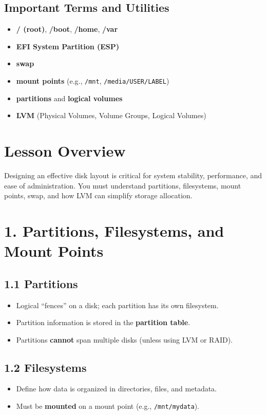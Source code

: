 \documentclass[12pt,a4paper]{report}
\begin{document}
\subsection*{Important Terms and Utilities}
\begin{itemize}
    \item \textbf{/ (root)}, \textbf{/boot}, \textbf{/home}, \textbf{/var}  
    \item \textbf{EFI System Partition (ESP)}  
    \item \textbf{swap}  
    \item \textbf{mount points} (e.g., \texttt{/mnt}, \texttt{/media/USER/LABEL})  
    \item \textbf{partitions} and \textbf{logical volumes}  
    \item \textbf{LVM} (Physical Volumes, Volume Groups, Logical Volumes)
\end{itemize}



\section*{Lesson Overview}

Designing an effective disk layout is critical for system stability, performance, and ease of administration. You must understand partitions, filesystems, mount points, swap, and how LVM can simplify storage allocation.



\section*{1. Partitions, Filesystems, and Mount Points}

\subsection*{1.1 Partitions}
\begin{itemize}
    \item Logical “fences” on a disk; each partition has its own filesystem.  
    \item Partition information is stored in the \textbf{partition table}.  
    \item Partitions \textbf{cannot} span multiple disks (unless using LVM or RAID).  
\end{itemize}

\subsection*{1.2 Filesystems}
\begin{itemize}
    \item Define how data is organized in directories, files, and metadata.  
    \item Must be \textbf{mounted} on a mount point (e.g., \texttt{/mnt/mydata}).  
\end{itemize}
\end{document}

